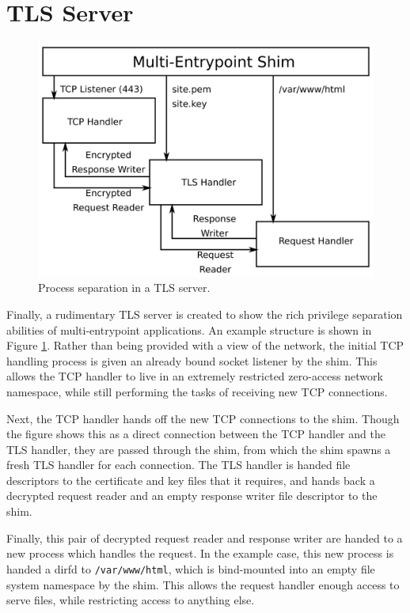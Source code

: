 \documentclass[a4paper,12pt,twoside,openright]{report}
\begin{document}
\section{TLS Server}

\begin{figure}
    \centering
    \includegraphics[width=\columnwidth]{figures/tls-server-splitting.png}
    \caption{Process separation in a TLS server.}
    \label{fig:tls-server-splitting}
\end{figure}

Finally, a rudimentary TLS server is created to show the rich privilege separation abilities of multi-entrypoint applications. An example structure is shown in Figure \ref{fig:tls-server-splitting}. Rather than being provided with a view of the network, the initial TCP handling process is given an already bound socket listener by the shim. This allows the TCP handler to live in an extremely restricted zero-access network namespace, while still performing the tasks of receiving new TCP connections.

Next, the TCP handler hands off the new TCP connections to the shim. Though the figure shows this as a direct connection between the TCP handler and the TLS handler, they are passed through the shim, from which the shim spawns a fresh TLS handler for each connection. The TLS handler is handed file descriptors to the certificate and key files that it requires, and hands back a decrypted request reader and an empty response writer file descriptor to the shim.

Finally, this pair of decrypted request reader and response writer are handed to a new process which handles the request. In the example case, this new process is handed a dirfd to \texttt{/var/www/html}, which is bind-mounted into an empty file system namespace by the shim. This allows the request handler enough access to serve files, while restricting access to anything else.
\end{document}
